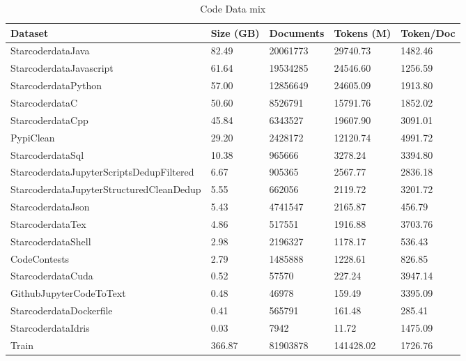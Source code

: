\begin{table}
    \centering
        \begin{tabular}{lllll}
        \toprule
        Dataset & Size (GB) & Documents & Tokens (M) & Token/Doc \\
        \midrule
        StarcoderdataJava & 82.49 & 20061773 & 29740.73 & 1482.46 \\
        StarcoderdataJavascript & 61.64 & 19534285 & 24546.60 & 1256.59 \\
        StarcoderdataPython & 57.00 & 12856649 & 24605.09 & 1913.80 \\
        StarcoderdataC & 50.60 & 8526791 & 15791.76 & 1852.02 \\
        StarcoderdataCpp & 45.84 & 6343527 & 19607.90 & 3091.01 \\
        PypiClean & 29.20 & 2428172 & 12120.74 & 4991.72 \\
        StarcoderdataSql & 10.38 & 965666 & 3278.24 & 3394.80 \\
        StarcoderdataJupyterScriptsDedupFiltered & 6.67 & 905365 & 2567.77 & 2836.18 \\
        StarcoderdataJupyterStructuredCleanDedup & 5.55 & 662056 & 2119.72 & 3201.72 \\
        StarcoderdataJson & 5.43 & 4741547 & 2165.87 & 456.79 \\
        StarcoderdataTex & 4.86 & 517551 & 1916.88 & 3703.76 \\
        StarcoderdataShell & 2.98 & 2196327 & 1178.17 & 536.43 \\
        CodeContests & 2.79 & 1485888 & 1228.61 & 826.85 \\
        StarcoderdataCuda & 0.52 & 57570 & 227.24 & 3947.14 \\
        GithubJupyterCodeToText & 0.48 & 46978 & 159.49 & 3395.09 \\
        StarcoderdataDockerfile & 0.41 & 565791 & 161.48 & 285.41 \\
        StarcoderdataIdris & 0.03 & 7942 & 11.72 & 1475.09 \\
        \hline
        Train & 366.87 & 81903878 & 141428.02 & 1726.76 \\
        \bottomrule
        \end{tabular}

    \caption[Code data mix]{Code Data mix}
    \label{tab:tab_code}
\end{table}


